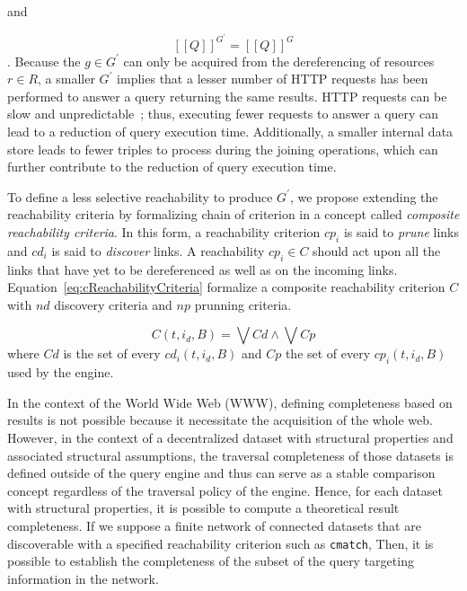 and 

\begin{equation}\label{eq:evalQueryStructuralAssumption}
   [\![ Q ]\!]^{G^{\prime}} = [\![ Q ]\!]^{G}
\end{equation}
.
Because the $g \in G^{\prime}$ can only be acquired from the dereferencing of resources $r \in R$, a smaller $G^\prime$ implies that a lesser number of HTTP requests has been performed to answer a query
returning the same results.
HTTP requests can be slow and unpredictable~\cite{hartig2016walking}; thus, executing fewer requests to answer a query can lead to a reduction of query execution time.
Additionally, a smaller internal data store leads to fewer triples to process during the joining operations, which can further contribute to the reduction of query execution time.

To define a less selective reachability to produce $G^{\prime}$, we propose extending the reachability criteria by formalizing chain of criterion in a concept called \emph{composite reachability criteria}.
In this form, a reachability criterion $cp_i$ is said to \emph{prune} links and $cd_i$ is said to \emph{discover} links.
A reachability $cp_i \in C$ should act upon all the links that have yet to be dereferenced as well as on the incoming links.
Equation~\ref{eq:cReachabilityCriteria} formalize a composite reachability criterion $C$ with $nd$ discovery criteria and $np$ prunning criteria.

\begin{equation}\label{eq:cReachabilityCriteria}
    C(t, i_d, B)  = \bigvee Cd \land \bigvee Cp
\end{equation}
where $Cd$ is the set of every $cd_i(t, i_d, B)$ and $Cp$ the set of every $cp_i(t, i_d, B)$ used by the engine.
\iffalse
Maybe refer to the link queue here in a footnote.
\fi

\iffalse
In the context of the World Wide Web (WWW), defining completeness based on results is not possible because it necessitate the acquisition of the whole web.
However, in the context of a decentralized dataset with structural properties and associated structural assumptions,
the traversal completeness of those datasets is defined outside of the query engine and thus can serve as a 
stable comparison concept regardless of the traversal policy of the engine.
Hence, for each dataset with structural properties, it is possible to compute a theoretical result completeness.
If we suppose a finite network of connected datasets that are discoverable with a specified reachability criterion such as \texttt{cmatch},
Then, it is possible to establish the completeness of the subset of the query targeting information in the network.



